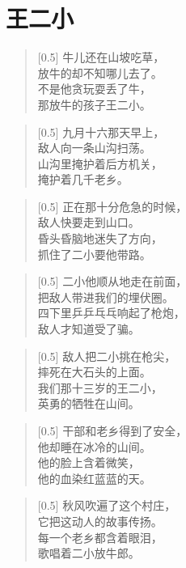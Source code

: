 \documentclass[12pt,UTF-8,openany]{ctexbook}
\begin{document}
\chapter{王二小}

\begin{large}
    
    \begin{verse}[0.5\linewidth]
        牛儿还在山坡吃草， \\
        放牛的却不知哪儿去了。 \\
        不是他贪玩耍丢了牛， \\
        那放牛的孩子王二小。
    \end{verse}
    
    
    \begin{verse}[0.5\linewidth]
        九月十六那天早上， \\
        敌人向一条山沟扫荡。 \\
        山沟里掩护着后方机关， \\
        掩护着几千老乡。
    \end{verse}
    
    
    \begin{verse}[0.5\linewidth]
        正在那十分危急的时候， \\
        敌人快要走到山口。 \\
        昏头昏脑地迷失了方向， \\
        抓住了二小要他带路。
    \end{verse}
    
    
    \begin{verse}[0.5\linewidth]
        二小他顺从地走在前面， \\
        把敌人带进我们的埋伏圈。 \\
        四下里乒乒乓乓响起了枪炮， \\
        敌人才知道受了骗。
    \end{verse}
    
    
    \begin{verse}[0.5\linewidth]
        敌人把二小挑在枪尖， \\
        摔死在大石头的上面。 \\
        我们那十三岁的王二小， \\
        英勇的牺牲在山间。
    \end{verse}
    
    
    \begin{verse}[0.5\linewidth]
        干部和老乡得到了安全， \\
        他却睡在冰冷的山间。 \\
        他的脸上含着微笑， \\
        他的血染红蓝蓝的天。
    \end{verse}
    
    
    \begin{verse}[0.5\linewidth]
        秋风吹遍了这个村庄， \\
        它把这动人的故事传扬。 \\
        每一个老乡都含着眼泪， \\
        歌唱着二小放牛郎。
    \end{verse}
    
\end{large}
\end{document}
